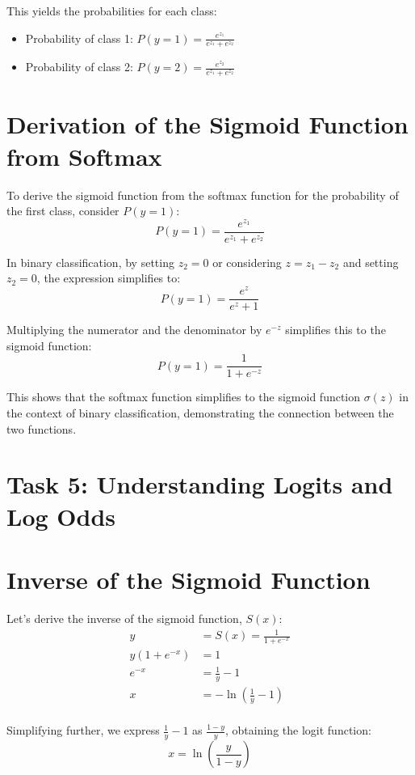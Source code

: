 \documentclass[10pt]{article}
\begin{document}
This yields the probabilities for each class:
\begin{itemize}
    \item Probability of class 1: \( P(y=1) = \frac{e^{z_1}}{e^{z_1} + e^{z_2}} \)
    \item Probability of class 2: \( P(y=2) = \frac{e^{z_2}}{e^{z_1} + e^{z_2}} \)
\end{itemize}

\section*{Derivation of the Sigmoid Function from Softmax}
To derive the sigmoid function from the softmax function for the probability of the first class, consider \( P(y=1) \):
\[ P(y=1) = \frac{e^{z_1}}{e^{z_1} + e^{z_2}} \]

In binary classification, by setting \( z_2 = 0 \) or considering \( z = z_1 - z_2 \) and setting \( z_2 = 0 \), the expression simplifies to:
\[ P(y=1) = \frac{e^{z}}{e^{z} + 1} \]

Multiplying the numerator and the denominator by \( e^{-z} \) simplifies this to the sigmoid function:
\[ P(y=1) = \frac{1}{1 + e^{-z}} \]

This shows that the softmax function simplifies to the sigmoid function \( \sigma(z) \) in the context of binary classification, demonstrating the connection between the two functions.


\section*{\textbf{Task 5}: Understanding Logits and Log Odds}

\section*{Inverse of the Sigmoid Function}

Let's derive the inverse of the sigmoid function, $S(x)$:
\begin{align*}
y &= S(x) = \frac{1}{1 + e^{-x}} \\
y(1 + e^{-x}) &= 1 \\
e^{-x} &= \frac{1}{y} - 1 \\
x &= -\ln \left( \frac{1}{y} - 1 \right) \\
\end{align*}

Simplifying further, we express \( \frac{1}{y} - 1 \) as \( \frac{1 - y}{y} \), obtaining the logit function:
\[ x = \ln\left(\frac{y}{1 - y}\right) \]
\end{document}
